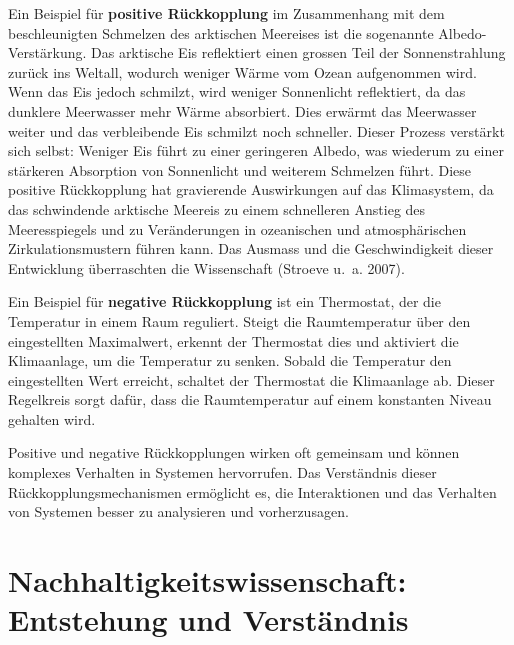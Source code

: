 \documentclass[
  nswissgerman,
  a4paper,
  openany]{book}
\begin{document}
Ein Beispiel für \textbf{positive Rückkopplung} im Zusammenhang mit dem
beschleunigten Schmelzen des arktischen Meereises ist die sogenannte
Albedo-Verstärkung. Das arktische Eis reflektiert einen grossen Teil der
Sonnenstrahlung zurück ins Weltall, wodurch weniger Wärme vom Ozean
aufgenommen wird. Wenn das Eis jedoch schmilzt, wird weniger Sonnenlicht
reflektiert, da das dunklere Meerwasser mehr Wärme absorbiert. Dies
erwärmt das Meerwasser weiter und das verbleibende Eis schmilzt noch
schneller. Dieser Prozess verstärkt sich selbst: Weniger Eis führt zu
einer geringeren Albedo, was wiederum zu einer stärkeren Absorption von
Sonnenlicht und weiterem Schmelzen führt. Diese positive Rückkopplung
hat gravierende Auswirkungen auf das Klimasystem, da das schwindende
arktische Meereis zu einem schnelleren Anstieg des Meeresspiegels und zu
Veränderungen in ozeanischen und atmosphärischen Zirkulationsmustern
führen kann. Das Ausmass und die Geschwindigkeit dieser Entwicklung
überraschten die Wissenschaft (Stroeve u.~a. 2007).

Ein Beispiel für \textbf{negative Rückkopplung} ist ein Thermostat, der
die Temperatur in einem Raum reguliert. Steigt die Raumtemperatur über
den eingestellten Maximalwert, erkennt der Thermostat dies und aktiviert
die Klimaanlage, um die Temperatur zu senken. Sobald die Temperatur den
eingestellten Wert erreicht, schaltet der Thermostat die Klimaanlage ab.
Dieser Regelkreis sorgt dafür, dass die Raumtemperatur auf einem
konstanten Niveau gehalten wird.

Positive und negative Rückkopplungen wirken oft gemeinsam und können
komplexes Verhalten in Systemen hervorrufen. Das Verständnis dieser
Rückkopplungsmechanismen ermöglicht es, die Interaktionen und das
Verhalten von Systemen besser zu analysieren und vorherzusagen.

\section{Nachhaltigkeitswissenschaft: Entstehung und
Verständnis}\label{nachhaltigkeitswissenschaft-entstehung-und-verstuxe4ndnis}
\end{document}
